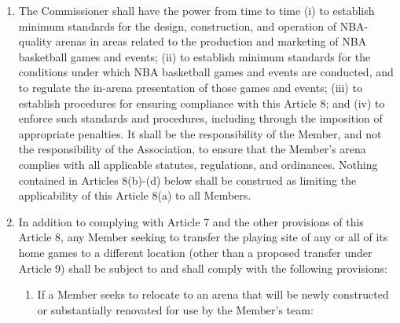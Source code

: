 \documentclass[]{book}
\providecommand{\tightlist}{%
  \setlength{\itemsep}{0pt}\setlength{\parskip}{0pt}}
\theoremstyle{definition}
\theoremstyle{definition}
\theoremstyle{definition}
\theoremstyle{remark}
\begin{document}
\begin{enumerate}
\def\labelenumi{(\alph{enumi})}
\tightlist
\item
  The Commissioner shall have the power from time to time (i) to
  establish minimum standards for the design, construction, and
  operation of NBA-quality arenas in areas related to the production and
  marketing of NBA basketball games and events; (ii) to establish
  minimum standards for the conditions under which NBA basketball games
  and events are conducted, and to regulate the in-arena presentation of
  those games and events; (iii) to establish procedures for ensuring
  compliance with this Article 8; and (iv) to enforce such standards and
  procedures, including through the imposition of appropriate penalties.
  It shall be the responsibility of the Member, and not the
  responsibility of the Association, to ensure that the Member's arena
  complies with all applicable statutes, regulations, and ordinances.
  Nothing contained in Articles 8(b)-(d) below shall be construed as
  limiting the applicability of this Article 8(a) to all Members.
\item
  In addition to complying with Article 7 and the other provisions of
  this Article 8, any Member seeking to transfer the playing site of any
  or all of its home games to a different location (other than a
  proposed transfer under Article 9) shall be subject to and shall
  comply with the following provisions:

  \begin{enumerate}
  \def\labelenumii{(\roman{enumii})}
  \tightlist
  \item
    If a Member seeks to relocate to an arena that will be newly
    constructed or substantially renovated for use by the Member's team:


\end{enumerate}
\end{enumerate}
\end{document}
